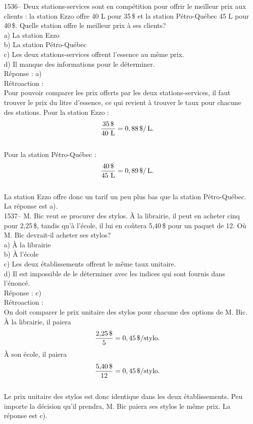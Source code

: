 1536-- Deux stations-services sont en comp\'etition pour offrir le
meilleur prix aux clients : la station Ezzo offre 40 L pour 35\,\$
et la station P\'etro-Qu\'ebec 45 L pour 40\,\$. Quelle station
offre le meilleur
prix \`a ses clients?\\
a) La station Ezzo\\
b) La station P\'etro-Qu\'ebec\\
c) Les deux stations-services offrent l'essence au m\^eme prix.\\
d) Il manque des informations pour le d\'eterminer.\\

R\'eponse : a)\\

R\'etroaction :\\
Pour pouvoir comparer les prix offerts par les deux
stations-services, il faut trouver le prix du litre d'essence, ce
qui revient \`a trouver le taux pour chacune des stations. Pour la
station Ezzo :
$$\frac{\textrm{35\,\$}}{\textrm{40
L}}=0,88\,\$/\,{\textrm{L}}.$$\\[3mm]
Pour la station P\'etro-Qu\'ebec
:$$\frac{\textrm{40\,\$}}{\textrm{45
L}}=0,89\,\$/\,{\textrm{L}}.$$\\[3mm]
La station Ezzo offre donc un tarif un
peu plus bas que la station P\'etro-Qu\'ebec. La r\'eponse est a).\\

1537-- M. Bic veut se procurer des stylos. \`A la librairie, il peut
en acheter cinq pour 2,25\,\$, tandis qu'\`a l'\'ecole, il lui en
co\^utera 5,40\,\$ pour un paquet de 12. O\`u M. Bic
devrait-il acheter ses stylos? \\
a) \`A la librairie\\
b) \`A l'\'ecole\\
c) Les deux \'etablissements offrent le m\^eme taux unitaire.\\
d) Il est impossible de le d\'eterminer avec les indices qui sont fournis
dans l'\'enonc\'e.\\

R\'eponse : c)\\

R\'etroaction :\\
On doit comparer le prix unitaire des stylos pour chacune des
options de M. Bic. \`A la librairie, il paiera
$$\frac{\textrm{2,25\,\$}}{\textrm{5}}=0,45\,\$/{\textrm{stylo}}.$$ \`A son
\'ecole, il
paiera
$$\frac{\textrm{5,40\,\$}}{\textrm{12}}=0,45\,\$/{\textrm{stylo}}.$$\\
Le prix unitaire des stylos est donc identique dans les deux
\'etablissements. Peu importe la d\'ecision qu'il prendra, M. Bic
paiera ses stylos le m\^eme prix. La r\'eponse est c).\\

